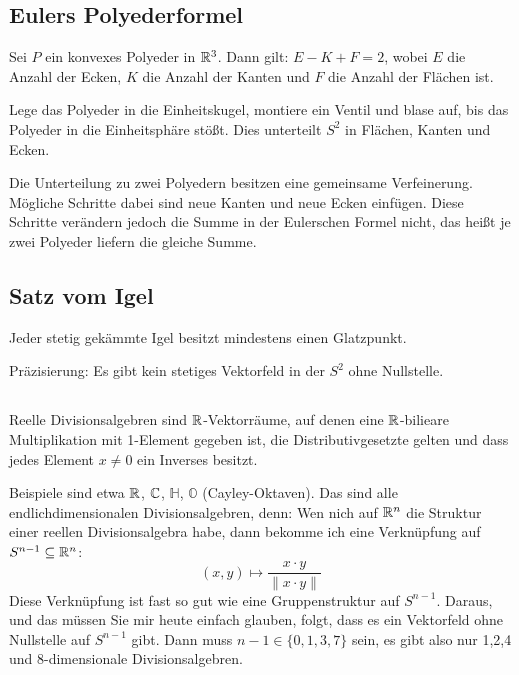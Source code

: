 \documentclass[a4paper,twoside,DIV15,BCOR12mm]{scrbook}
\begin{document}
\subsection{Eulers Polyederformel}

Sei $P$ ein konvexes Polyeder in $\mathbb{R}^3$. Dann gilt: $E - K + F = 2$, wobei $E$ die Anzahl der Ecken, $K$ die Anzahl der Kanten und $F$ die Anzahl der Flächen ist.

\begin{beweis}[Idee]
Lege das Polyeder in die Einheitskugel, montiere ein Ventil und blase auf, bis das Polyeder in die Einheitsphäre stößt. Dies unterteilt $S^2$ in Flächen, Kanten und Ecken.

Die Unterteilung zu zwei Polyedern besitzen eine gemeinsame Verfeinerung. Mögliche Schritte dabei sind neue Kanten und neue Ecken einfügen. Diese Schritte verändern jedoch die Summe in der Eulerschen Formel nicht, das heißt je zwei Polyeder liefern die gleiche Summe.
\end{beweis}

\subsection{Satz vom Igel}

\begin{satz}
Jeder stetig gekämmte Igel besitzt mindestens einen Glatzpunkt.

Präzisierung: Es gibt kein stetiges Vektorfeld in der $S^2$ ohne Nullstelle.
\end{satz}

\subsection{}

Reelle Divisionsalgebren sind $\mathbb{R}$-Vektorräume, auf denen eine $\mathbb{R}$-bilieare Multiplikation mit 1-Element gegeben ist, die Distributivgesetzte gelten und dass jedes Element $x\ne 0$ ein Inverses besitzt.

Beispiele sind etwa $\mathbb{R}$, $\mathbb{C}$, $\mathbb H$, $\mathbb O$ (Cayley-Oktaven). Das sind alle endlichdimensionalen Divisionsalgebren, denn: Wen nich auf $\mathbb{R}^n$ die Struktur einer reellen Divisionsalgebra habe, dann bekomme ich eine Verknüpfung auf $S^{n-1}\subseteq \mathbb{R}^n$:
\[ (x,y) \mapsto \frac{x\cdot y}{\|x\cdot y\|} \]
Diese Verknüpfung ist fast so gut wie eine Gruppenstruktur auf $S^{n-1}$. Daraus, und das müssen Sie mir heute einfach glauben, folgt, dass es ein Vektorfeld ohne Nullstelle auf $S^{n-1}$ gibt. Dann muss $n-1\in\{0,1,3,7\}$ sein, es gibt also nur 1,2,4 und 8-dimensionale Divisionsalgebren.
\end{document}
